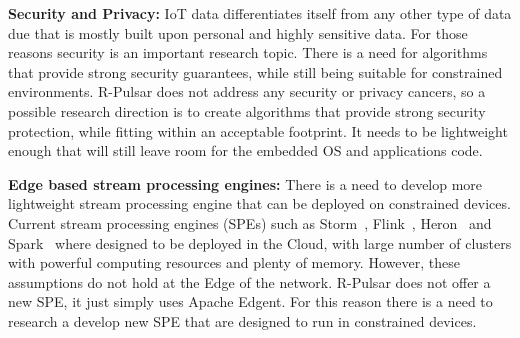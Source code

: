 \textbf{Security and Privacy:} IoT data differentiates itself from any other type of data due that is mostly built upon personal and highly sensitive data. For those reasons security is an important research topic. There is a need for algorithms that provide strong security guarantees, while still being suitable for constrained environments. R-Pulsar does not address any security or privacy cancers, so a possible research direction is to create algorithms that provide strong security protection, while fitting within an acceptable footprint. It needs to be lightweight enough that will still leave room for the embedded OS and applications code. 

\textbf{Edge based stream processing engines:} There is a need to develop more lightweight stream processing engine that can be deployed on constrained devices. Current stream processing engines (SPEs) such as Storm~\cite{storm}, Flink~\cite{flink}, Heron~\cite{heron} and Spark~\cite{spark} where designed to be deployed in the Cloud, with large number of clusters with powerful computing resources and plenty of memory. However, these assumptions do not hold at the Edge of the network. R-Pulsar does not offer a new SPE, it just simply uses Apache Edgent. For this reason there is a need to research a develop new SPE that are designed to run in constrained devices.
